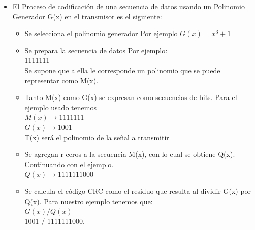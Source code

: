 \begin{itemize}
    \item El Proceso de codificación de una secuencia de datos  usando un Polinomio Generador G(x) en el transmisor es el siguiente:
\begin{itemize}
    \item Se selecciona el polinomio generador Por ejemplo $G(x)=x^{3}+1$
    \item Se prepara la secuencia de datos
Por ejemplo:\\ 
1111111\\ 
	Se supone que a ella le corresponde un polinomio que se puede representar como M(x).
    \item Tanto M(x) como G(x) se expresan como secuencias de bits.
    Para el ejemplo usado tenemos \\
$M(x) \rightarrow 1111111$ \\
$G(x) \rightarrow 1001$ \\
T(x) será el polinomio de la señal a transmitir \\
    \item Se agregan r ceros a la secuencia M(x), con lo cual se obtiene Q(x). Continuando con el ejemplo.\\
    $ Q(x) \rightarrow 1111111000$
    \item Se calcula el código CRC como el residuo que resulta al dividir G(x) por Q(x). Para nuestro ejemplo tenemos que: \\
$G(x)/Q(x)$ \\
1001 / 1111111000. \\

\begin{table}[h!]
	\centering
\end{table}



\end{itemize}
\end{itemize}
